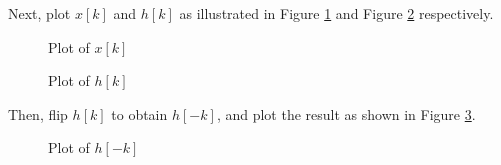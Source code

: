 \documentclass[fleqn]{article}
\begin{document}
\begin{enumerate}[nolistsep]
		Next, plot $x[k]$ and $h[k]$ as illustrated in Figure \ref{prob1_xk_plot} and Figure \ref{prob1_hk_plot} respectively. 
		
		\begin{figure}[H]				
			\centerline{}
			\caption{Plot of $x[k]$}
			\label{prob1_xk_plot}
		\end{figure}
		
		\begin{figure}[H]				
			\centerline{}
			\caption{Plot of $h[k]$}
			\label{prob1_hk_plot}
		\end{figure}
		
		Then, flip $h[k]$ to obtain $h[-k]$, and plot the result as shown in Figure \ref{prob1_h-k_plot}.
		
		\begin{figure}[H]				
			\centerline{}
			\caption{Plot of $h[-k]$}
			\label{prob1_h-k_plot}
		\end{figure}
		

\end{enumerate}
\end{document}
